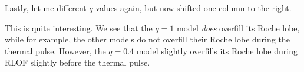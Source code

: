 \documentclass[a4paper,10pt]{article}
\begin{document}
Lastly, let me different \(q\) values again, but now shifted one column to the right.

\begin{figure}[ht]
	\centering
\end{figure}

This is quite interesting.
We see that the \(q=1\) model \emph{does} overfill its Roche lobe, while for example, the other models do not overfill their Roche lobe during the thermal pulse.
However, the \(q=0.4\) model slightly overfills its Roche lobe during RLOF slightly before the thermal pulse.


\end{document}
